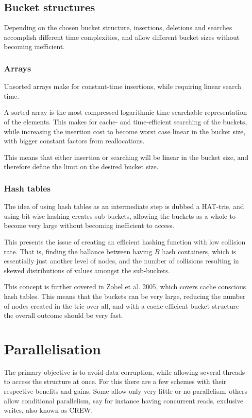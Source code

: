 \documentclass[11pt,a4paper]{article}
\begin{document}
\subsection{Bucket structures}
Depending on the chosen bucket structure, insertions, deletions and searches
accomplish different time complexities, and allow different bucket sizes
without becoming inefficient.

\subsubsection{Arrays}
Unsorted arrays make for constant-time insertions, while
requiring linear search time.

A sorted array is the most compressed logarithmic time searchable
representation of the elements. This makes for cache- and time-efficient
searching of the buckets, while increasing the insertion cost to become worst
case linear in the bucket size, with bigger constant factors from
reallocations.

This means that either insertion or searching will be linear in the bucket
size, and therefore define the limit on the desired bucket size.


\subsubsection{Hash tables}
The idea of using hash tables as an intermediate step is dubbed a HAT-trie,
and using bit-wise hashing creates sub-buckets, allowing the buckets
as a whole to become very large without becoming inefficient to access.

This presents the issue of creating an efficient hashing function with
low collision rate. That is, finding the ballance between having $B$
hash containers, which is essentially just another level of nodes, and
the number of collisions resulting in skewed distributions of values amongst
the sub-buckets. 

This concept is further covered in Zobel et al. 2005, which covers cache conscious
hash tables. This means that the buckets can be very large, reducing the number of
nodes created in the trie over all, and with a cache-efficient bucket structure
the overall outcome should be very fast.

\section{Parallelisation}
The primary objective is to avoid data corruption, while allowing several threads
to access the structure at once. For this there are a few schemes with their
respective benefits and gains. Some allow only very little or no parallelism,
others allow conditional parallelism, say for instance having concurrent reads,
exclusive writes, also known as CREW.
\end{document}
